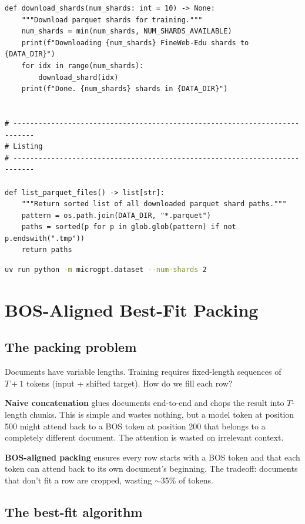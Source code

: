 \begin{lstlisting}
def download_shards(num_shards: int = 10) -> None:
    """Download parquet shards for training."""
    num_shards = min(num_shards, NUM_SHARDS_AVAILABLE)
    print(f"Downloading {num_shards} FineWeb-Edu shards to {DATA_DIR}")
    for idx in range(num_shards):
        download_shard(idx)
    print(f"Done. {num_shards} shards in {DATA_DIR}")


# ---------------------------------------------------------------------------
# Listing
# ---------------------------------------------------------------------------

def list_parquet_files() -> list[str]:
    """Return sorted list of all downloaded parquet shard paths."""
    pattern = os.path.join(DATA_DIR, "*.parquet")
    paths = sorted(p for p in glob.glob(pattern) if not p.endswith(".tmp"))
    return paths
\end{lstlisting}


\shelltag
\begin{lstlisting}[language=bash]
uv run python -m microgpt.dataset --num-shards 2
\end{lstlisting}


\section{BOS-Aligned Best-Fit Packing}

\subsection{The packing problem}

Documents have variable lengths.  Training requires fixed-length sequences of $T+1$ tokens (input + shifted target).  How do we fill each row?

\textbf{Naive concatenation} glues documents end-to-end and chops the result into $T$-length chunks.  This is simple and wastes nothing, but a model token at position 500 might attend back to a BOS token at position 200 that belongs to a completely different document.  The attention is wasted on irrelevant context.

\textbf{BOS-aligned packing} ensures every row starts with a BOS token and that each token can attend back to its own document's beginning.  The tradeoff: documents that don't fit a row are cropped, wasting $\sim$35\% of tokens.

\subsection{The best-fit algorithm}

